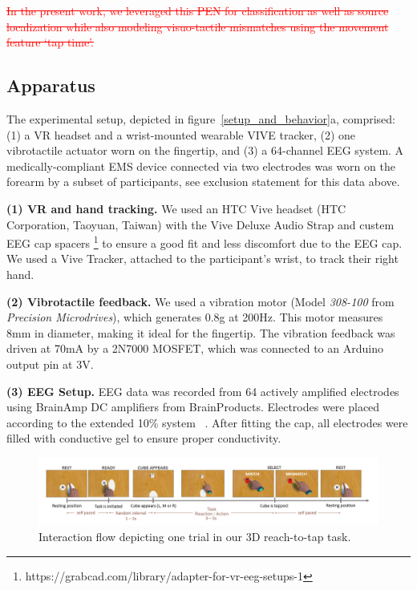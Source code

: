 \textcolor{red}{\st{In the present work, we leveraged this PEN for classification as well as source localization while also modeling visuo-tactile mismatches using the movement feature `tap time'.}}

\subsection{Apparatus}
The experimental setup, depicted in figure~\ref{setup_and_behavior}a, comprised: (1) a VR headset and a wrist-mounted wearable VIVE tracker, (2) one vibrotactile actuator worn on the fingertip, and (3) a 64-channel EEG system. A medically-compliant EMS device connected via two electrodes was worn on the forearm by a subset of participants, see exclusion statement for this data above.

\textbf{(1) VR and hand tracking.} We used an HTC Vive headset (HTC Corporation, Taoyuan, Taiwan) with the Vive Deluxe Audio Strap and custem EEG cap spacers \footnote{https://grabcad.com/library/adapter-for-vr-eeg-setups-1} to ensure a good fit and less discomfort due to the EEG cap. We used a Vive Tracker, attached to the participant's wrist, to track their right hand. 

\textbf{(2) Vibrotactile feedback.} We used a vibration motor (Model \textit{308-100} from \textit{Precision Microdrives}), which generates 0.8g at 200Hz. This motor measures 8mm in diameter, making it ideal for the fingertip. The vibration feedback was driven at 70mA by a 2N7000 MOSFET, which was connected to an Arduino output pin at 3V.


\textbf{(3) EEG Setup.} EEG data was recorded from 64 actively amplified electrodes using BrainAmp DC amplifiers from BrainProducts. Electrodes were placed according to the extended 10\% system ~\cite{Chatrian1985-ys}. After fitting the cap, all electrodes were filled with conductive gel to ensure proper conductivity.

\begin{figure}[!ht]
\includegraphics[width=\linewidth]{figures/Task_mismatch.jpg}
\vspace{-15pt}
\caption{Interaction flow depicting one trial in our 3D reach-to-tap task.}
\label{task_flow}
\end{figure}

